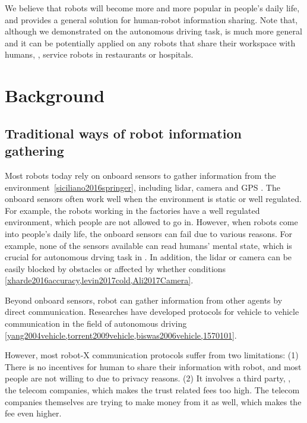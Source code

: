 \documentclass{article}
\begin{document}
We believe that robots will become more and more popular in
people's daily life, and \nrc provides a general solution
for human-robot information sharing.
Note that, although we demonstrated \nrc on the autonomous
driving task, \nrc is much more general and it can
be potentially applied on any robots that share their workspace
with humans, \eg, service robots in restaurants or hospitals.


\section{Background}
\label{sec:background}

\subsection{Traditional ways of robot information gathering}
\label{subsec:tranditional-ways}

Most robots today rely on onboard sensors to gather information
from the environment~\cref{siciliano2016springer},
including lidar, camera and GPS \etc.
The onboard sensors often work well when the environment is
static or well regulated.
For example, the robots working in the factories have a well
regulated environment, which people are not allowed to go in.
However, when robots come into people's daily life, the onboard
sensors can fail due to various reasons.
For example, none of the sensors available can read humans'
mental state, which is crucial for autonomous drving task in 
.
In addition, the lidar or camera can be easily blocked by
obstacles or affected by whether conditions
\cref{xharde2016accuracy,levin2017cold,Ali2017Camera}.


Beyond onboard sensors, 
robot can gather information from other agents by
direct communication.
Researches have developed protocols for vehicle to vehicle
communication in the field of autonomous driving
\cref{yang2004vehicle,torrent2009vehicle,biswas2006vehicle,1570101}.

However, most robot-X communication protocols
suffer from two limitations: (1) There is no incentives
for human to share their information with robot, and most people
are not willing to due to privacy reasons. (2) It involves
a third party, \eg, the telecom companies, which makes the trust 
related fees too high. The telecom companies themselves are trying
to make money from it as well, which makes the fee even higher.
\end{document}
